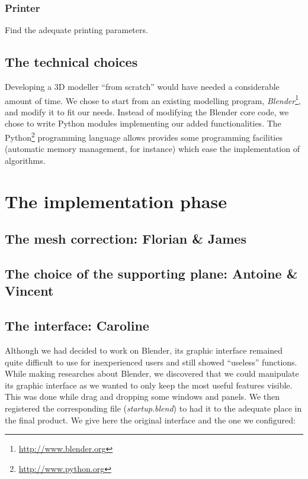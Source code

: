 \documentclass{report}
\begin{document}
\subsection{Printer}
Find the adequate printing parameters.

\section{The technical choices}
Developing a 3D modeller ``from scratch'' would have needed a considerable amount of time. We chose to start from an existing modelling program, \emph{Blender}\footnote{\url{http://www.blender.org}}, and modify it to fit our needs. Instead of modifying the Blender core code, we chose to write Python modules implementing our added functionalities. The Python\footnote{\url{http://www.python.org}} programming language allows provides some programming facilities (automatic memory management, for instance) which ease the implementation of algorithms.

\chapter{The implementation phase}

\section{The mesh correction: Florian \& James}

\section{The choice of the supporting plane: Antoine \& Vincent}

\section{The interface: Caroline}

Although we had decided to work on Blender, its graphic interface remained quite difficult to use for inexperienced users and still showed ``useless'' functions. \\
While making researches about Blender, we discovered that we could manipulate its graphic interface as we wanted to only keep the most useful features visible. This was done while drag 	and dropping some windows and panels. We then registered the corresponding file (\textit{startup.blend}) to had it to the adequate place in the final product. We give here the original interface and the one we configured:
\end{document}
